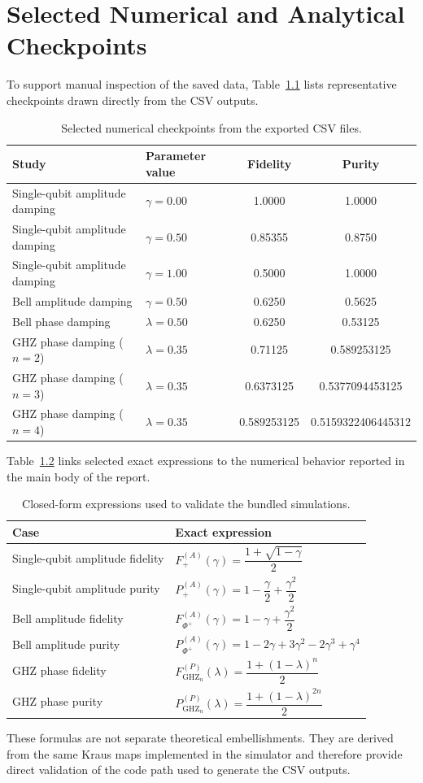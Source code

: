 \chapter{Selected Numerical and Analytical Checkpoints}

To support manual inspection of the saved data, Table~\ref{tab:selected_points} lists representative checkpoints drawn directly from the CSV outputs.

\begin{table}[t]
\centering
\caption{Selected numerical checkpoints from the exported CSV files.}
\label{tab:selected_points}
\begin{tabular}{p{4.2cm} p{2.4cm} c c}
\toprule
Study & Parameter value & Fidelity & Purity \\
\midrule
Single-qubit amplitude damping & $\gamma = 0.00$ & 1.0000 & 1.0000 \\
Single-qubit amplitude damping & $\gamma = 0.50$ & 0.85355 & 0.8750 \\
Single-qubit amplitude damping & $\gamma = 1.00$ & 0.5000 & 1.0000 \\
Bell amplitude damping & $\gamma = 0.50$ & 0.6250 & 0.5625 \\
Bell phase damping & $\lambda = 0.50$ & 0.6250 & 0.53125 \\
GHZ phase damping ($n = 2$) & $\lambda = 0.35$ & 0.71125 & 0.589253125 \\
GHZ phase damping ($n = 3$) & $\lambda = 0.35$ & 0.6373125 & 0.5377094453125 \\
GHZ phase damping ($n = 4$) & $\lambda = 0.35$ & 0.589253125 & 0.5159322406445312 \\
\bottomrule
\end{tabular}
\end{table}

Table~\ref{tab:closed_forms} links selected exact expressions to the numerical behavior reported in the main body of the report.

\begin{table}[t]
\centering
\caption{Closed-form expressions used to validate the bundled simulations.}
\label{tab:closed_forms}
\begin{tabular}{p{4.7cm} p{8.2cm}}
\toprule
Case & Exact expression \\
\midrule
Single-qubit amplitude fidelity & $F_+^{(A)}(\gamma) = \dfrac{1 + \sqrt{1-\gamma}}{2}$ \\
Single-qubit amplitude purity & $P_+^{(A)}(\gamma) = 1 - \dfrac{\gamma}{2} + \dfrac{\gamma^2}{2}$ \\
Bell amplitude fidelity & $F_{\Phi^+}^{(A)}(\gamma) = 1 - \gamma + \dfrac{\gamma^2}{2}$ \\
Bell amplitude purity & $P_{\Phi^+}^{(A)}(\gamma) = 1 - 2\gamma + 3\gamma^2 - 2\gamma^3 + \gamma^4$ \\
GHZ phase fidelity & $F_{\mathrm{GHZ}_n}^{(P)}(\lambda) = \dfrac{1 + (1-\lambda)^n}{2}$ \\
GHZ phase purity & $P_{\mathrm{GHZ}_n}^{(P)}(\lambda) = \dfrac{1 + (1-\lambda)^{2n}}{2}$ \\
\bottomrule
\end{tabular}
\end{table}

These formulas are not separate theoretical embellishments. They are derived from the same Kraus maps implemented in the simulator and therefore provide direct validation of the code path used to generate the CSV outputs.
